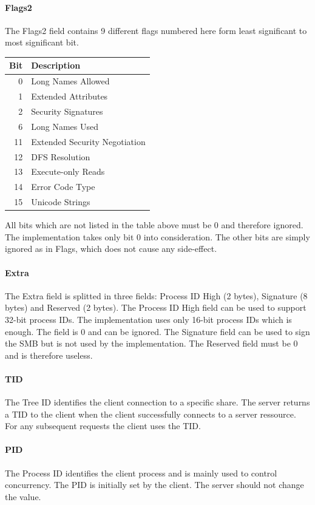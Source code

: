 \documentclass[11pt,a4paper]{book}
\begin{document}
\paragraph{Flags2} The Flags2 field contains 9 different flags numbered here form least significant to most significant bit.
\begin{center}
	\begin{tabular}{r|l}
		Bit & Description \\ 
		\hline
		0 & Long Names Allowed \\
		1 & Extended Attributes \\
		2 & Security Signatures \\
		6 & Long Names Used \\
		11 & Extended Security Negotiation \\
		12 & DFS Resolution \\
		13 & Execute-only Reads \\
		14 & Error Code Type \\
		15 & Unicode Strings \\
	\end{tabular}
\end{center}
All bits which are not listed in the table above must be 0 and therefore ignored. The implementation takes only bit 0 into consideration. The other bits are simply ignored as in Flags, which does not cause any side-effect.

\paragraph{Extra} The Extra field is splitted in three fields: Process ID High (2 bytes), Signature (8 bytes) and Reserved (2 bytes). The Process ID High field can be used to support 32-bit process IDs. The implementation uses only 16-bit process IDs which is enough. The field is 0 and can be ignored. The Signature field can be used to sign the SMB but is not used by the implementation. The Reserved field must be 0 and is therefore useless.

\paragraph{TID} The Tree ID identifies the client connection to a specific share. The server returns a TID to the client when the client successfully connects to a server ressource. For any subsequent requests the client uses the TID.

\paragraph{PID} The Process ID identifies the client process and is mainly used to control concurrency. The PID is initially set by the client. The server should not change the value.
\end{document}
